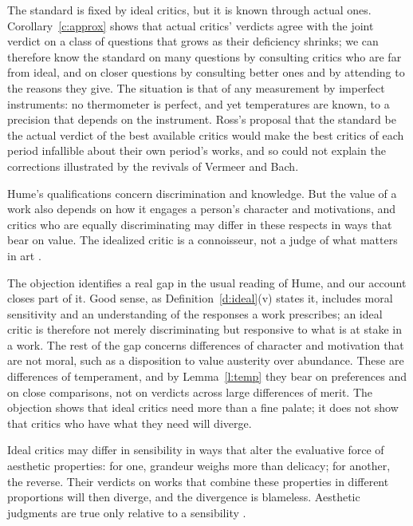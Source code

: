 \documentclass{situationist-preprint}
\begin{document}
\begin{reply}
The standard is fixed by ideal critics, but it is known through actual ones. Corollary~\ref{c:approx} shows that actual critics' verdicts agree with the joint verdict on a class of questions that grows as their deficiency shrinks; we can therefore know the standard on many questions by consulting critics who are far from ideal, and on closer questions by consulting better ones and by attending to the reasons they give. The situation is that of any measurement by imperfect instruments: no thermometer is perfect, and yet temperatures are known, to a precision that depends on the instrument. Ross's proposal that the standard be the actual verdict of the best available critics would make the best critics of each period infallible about their own period's works, and so could not explain the corrections illustrated by the revivals of Vermeer and Bach.
\end{reply}

\begin{objection}\label{o:kieran}
Hume's qualifications concern discrimination and knowledge. But the value of a work also depends on how it engages a person's character and motivations, and critics who are equally discriminating may differ in these respects in ways that bear on value. The idealized critic is a connoisseur, not a judge of what matters in art \citep{Kieran2008}.
\end{objection}

\begin{reply}
The objection identifies a real gap in the usual reading of Hume, and our account closes part of it. Good sense, as Definition~\ref{d:ideal}(v) states it, includes moral sensitivity and an understanding of the responses a work prescribes; an ideal critic is therefore not merely discriminating but responsive to what is at stake in a work. The rest of the gap concerns differences of character and motivation that are not moral, such as a disposition to value austerity over abundance. These are differences of temperament, and by Lemma~\ref{l:temp} they bear on preferences and on close comparisons, not on verdicts across large differences of merit. The objection shows that ideal critics need more than a fine palate; it does not show that critics who have what they need will diverge.
\end{reply}

\begin{objection}\label{o:rel}
Ideal critics may differ in sensibility in ways that alter the evaluative force of aesthetic properties: for one, grandeur weighs more than delicacy; for another, the reverse. Their verdicts on works that combine these properties in different proportions will then diverge, and the divergence is blameless. Aesthetic judgments are true only relative to a sensibility \citep{Goldman1995,Bender1996,Levinson2001}.
\end{objection}
\end{document}
